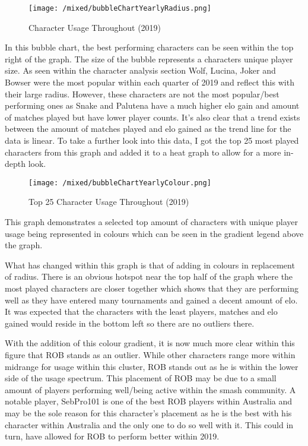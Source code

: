 \documentclass[11pt, oneside, a4paper]{article}
\begin{document}
\begin{figure}[!ht]
	\centerline{\texttt{[image: /mixed/bubbleChartYearlyRadius.png]}}
	\caption{Character Usage Throughout (2019)}
	\label{fig:figure14}
\end{figure}
In this bubble chart, the best performing characters can be seen within the top right of the graph. The size of the bubble represents a characters unique player size. As seen within the character analysis section Wolf, Lucina, Joker and Bowser were the most popular within each quarter of 2019 and reflect this with their large radius. However, these characters are not the most popular/best performing ones as Snake and Palutena have a much higher elo gain and amount of matches played but have lower player counts. It's also clear that a trend exists between the amount of matches played and elo gained as the trend line for the data is linear. To take a further look into this data, I got the top 25 most played characters from this graph and added it to a heat graph to allow for a more in-depth look.

\begin{figure}[!ht]
	\centerline{\texttt{[image: /mixed/bubbleChartYearlyColour.png]}}
	\caption{Top 25 Character Usage Throughout (2019)}
	\label{fig:figure15}
\end{figure}
This graph demonstrates a selected top amount of characters with unique player usage being represented in colours which can be seen in the gradient legend above the graph.

What has changed within this graph is that of adding in colours in replacement of radius. There is an obvious hotspot near the top half of the graph where the most played characters are closer together which shows that they are performing well as they have entered many tournaments and gained a decent amount of elo. It was expected that the characters with the least players, matches and elo gained would reside in the bottom left so there are no outliers there. 

With the addition of this colour gradient, it is now much more clear within this figure that ROB stands as an outlier. While other characters range more within midrange for usage within this cluster, ROB stands out as he is within the lower side of the usage spectrum. This placement of ROB may be due to a small amount of players performing well/being active within the smash community. A notable player, SebPro101 is one of the best ROB players within Australia and may be the sole reason for this character's placement as he is the best with his character within Australia and the only one to do so well with it. This could in turn, have allowed for ROB to perform better within 2019.
\end{document}
